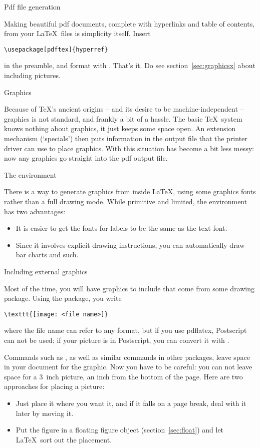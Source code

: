  {Pdf file generation}
\label{sec:hyperref}

Making beautiful pdf documents, complete with hyperlinks and table of
contents, from your \LaTeX\ files is simplicity itself. Insert
\begin{verbatim}
\usepackage[pdftex]{hyperref}
\end{verbatim}
in the preamble, and format with . That's it. Do see
section~\ref{sec:graphicsx} about including pictures.

 {Graphics}
\label{sec:graphics}

Because of \TeX's ancient origins -- and its desire to be
machine-independent -- graphics is not standard, and frankly a bit of
a hassle. The basic \TeX\ system knows nothing about graphics, it just
keeps some space open. An extension mechanism (`specials') then puts
information in the output file that the printer driver can use to
place graphics. With  this situation has become a bit less
messy: now any graphics go straight into the pdf output file.

 {The \protect{} environment}

There is a way to generate graphics from inside \LaTeX, using some
graphics fonts rather than a full drawing mode. While primitive and
limited, the  environment has two advantages:
\begin{itemize}
\item It is easier to get the fonts for labels to be the same as the
  text font.
\item Since it involves explicit drawing instructions, you can
  automatically draw bar charts and such.
\end{itemize}

 {Including external graphics}
\label{sec:graphicsx}

Most of the time, you will have graphics to include that come from
some drawing package. Using the  package, you write
\begin{verbatim}
\texttt{[image: <file name>]}
\end{verbatim}
where the file name can refer to any format, but if you use pdflatex,
Postscript can not be used; if your
picture is in Postscript, you can convert it with .

Commands such as , as well as similar commands in
other packages, leave space in your document for the graphic. Now you
have to be careful: you can not leave space for a 3~inch picture, an
inch from the bottom of the page. Here are two approaches
for placing a picture:
\begin{itemize}
\item Just place it where you want it, and if it falls on a page
  break, deal with it later by moving it.
\item Put the figure in a floating figure object
  (section~\ref{sec:float}) and let \LaTeX\ sort out the placement.
\end{itemize}


